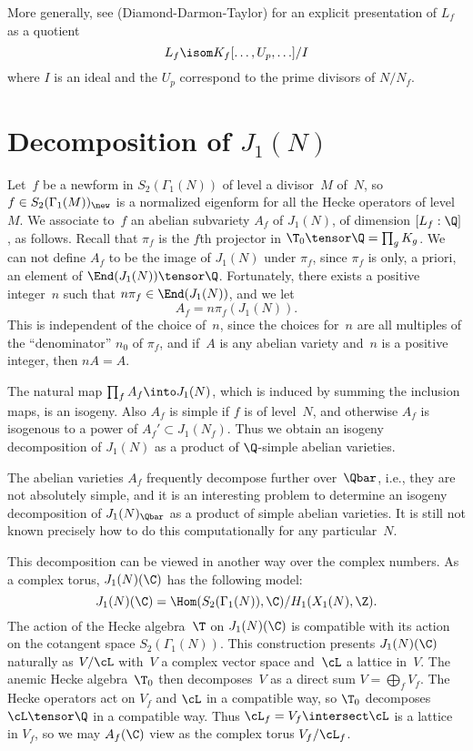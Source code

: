 \documentclass{report}
\begin{document}
More generally, see \cite[Lem.~4.4]{ddt}
(Diamond-Darmon-Taylor) for an explicit
presentation of $L_f$ as a quotient
$$L_f \isom K_f[\ldots,U_p,\ldots]/I$$
where $I$ is an ideal and the $U_p$ correspond to the prime divisors
of $N/N_f$.

\section{Decomposition of $J_1(N)$}

Let~$f$ be a newform in $S_2(\Gamma_1(N))$ of level a divisor~$M$
of~$N$, so $f\in S_2(\Gamma_1(M))_{\new}$ is a normalized
eigenform for all the Hecke operators of level~$M$. We associate
to~$f$ an abelian subvariety $A_f$ of $J_1(N)$, of dimension
$[L_f:\Q]$, as follows. Recall that $\pi_f$ is the $f$th projector
in $\T_0\tensor\Q=\prod_g K_g$.  We can not define $A_f$ to be the
image of $J_1(N)$ under $\pi_f$, since $\pi_f$ is only, a priori,
an element of $\End(J_1(N))\tensor\Q$.  Fortunately, there exists
a positive integer~$n$ such that $n\pi_f\in\End(J_1(N))$, and we
let $$A_f=n\pi_f(J_1(N)).$$ This is independent of the choice
of~$n$, since the choices for~$n$ are all multiples of the
``denominator'' $n_0$ of $\pi_f$, and if~$A$ is any abelian
variety and~$n$ is a positive integer, then $nA = A$.


The natural map $\prod_f A_f\into J_1(N)$, which is  induced by
summing the inclusion maps, is an isogeny.  Also $A_f$ is simple
if $f$ is of level~$N$, and otherwise $A_f$ is isogenous to a
power of $A_f'\subset J_1(N_f)$.  Thus we obtain an isogeny
decomposition of $J_1(N)$ as a product of $\Q$-simple abelian
varieties.

\begin{remark}
The abelian varieties $A_f$ frequently decompose further
over~$\Qbar$, i.e., they are not absolutely simple, and it is an
interesting problem to determine an isogeny decomposition of
$J_1(N)_{\Qbar}$ as a product of simple abelian varieties.  It is
still not known precisely how to do this computationally for any
particular~$N$.  
\end{remark}

This decomposition can be viewed in another way over the complex
numbers. As a complex torus, $J_1(N)(\C)$ has the following model:
\[
  J_1(N)(\C)=\Hom(S_2(\Gamma_1(N)),\C)/H_1(X_1(N),\Z).
\]
The action of the Hecke algebra~$\T$ on $J_1(N)(\C)$ is compatible with its
action on the cotangent space $S_2(\Gamma_1(N))$. This
construction presents $J_1(N)(\C)$ naturally as $V/\cL$ with~$V$ a
complex vector space and~$\cL$ a lattice in~$V$. The anemic Hecke
algebra~$\T_0$ then decomposes~$V$ as a direct sum $V=\bigoplus_f
V_f$. The Hecke operators act on $V_f$ and $\cL$ in a compatible
way, so $\T_0$ decomposes $\cL\tensor\Q$ in a compatible way.
Thus $\cL_f = V_f\intersect\cL$ is a lattice in $V_f$, so we may
$A_f(\C)$ view as the complex torus $V_f / \cL_f$.
\end{document}
